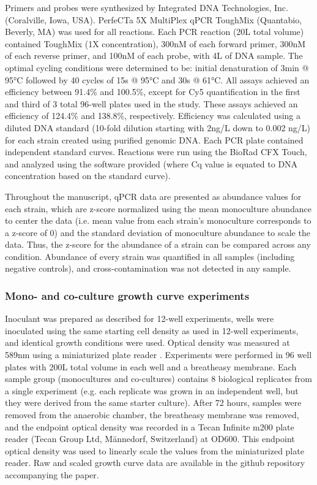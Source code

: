 \documentclass[11pt,onecolumn,notitlepage,openany,twoside]{book}
\begin{document}
\begin{refsection}
Primers and probes were synthesized by Integrated DNA Technologies, Inc. (Coralville, Iowa, USA). PerfeCTa 5X MultiPlex qPCR ToughMix (Quantabio, Beverly, MA) was used for all reactions. Each PCR reaction (20{\textmu}L total volume) contained ToughMix (1X concentration), 300nM of each forward primer, 300nM of each reverse primer, and 100nM of each probe, with 4{\textmu}L of DNA sample. The optimal cycling conditions were determined to be: initial denaturation of 3min @ 95°C followed by 40 cycles of 15s @  95°C and 30s @  61°C. All assays achieved an efficiency between 91.4\% and 100.5\%, except for Cy5 quantification in the first and third of 3 total 96-well plates used in the study. These assays achieved an efficiency of 124.4\% and 138.8\%, respectively. Efficiency was calculated using a diluted DNA standard (10-fold dilution starting with 2ng/{\textmu}L down to 0.002 ng/{\textmu}L) for each strain created using purified genomic DNA. Each PCR plate contained independent standard curves. Reactions were run using the BioRad CFX Touch, and analyzed using the software provided (where Cq value is equated to DNA concentration based on the standard curve).

Throughout the manuscript, qPCR data are presented as abundance values for each strain, which are z-score normalized using the mean monoculture abundance to center the data (i.e. mean value from each strain’s monoculture corresponds to a z-score of 0) and the standard deviation of monoculture abundance to scale the data. Thus, the z-score for the abundance of a strain can be compared across any condition. Abundance of every strain was quantified in all samples (including negative controls), and cross-contamination was not detected in any sample.

\subsubsection{Mono- and co-culture growth curve experiments}

Inoculant was prepared as described for 12-well experiments, wells were inoculated using the same starting cell density as used in 12-well experiments, and identical growth conditions were used. Optical density was measured at 589nm using a miniaturized plate reader \cite{Jensen2015-mw}. Experiments were performed in 96 well plates with 200{\textmu}L total volume in each well and a breatheasy membrane. Each sample group (monocultures and co-cultures) contains 8 biological replicates from a single experiment (e.g. each replicate was grown in an independent well, but they were derived from the same starter culture). After 72 hours, samples were removed from the anaerobic chamber, the breatheasy membrane was removed, and the endpoint optical density was recorded in a Tecan Infinite m200 plate reader (Tecan Group Ltd, Männedorf, Switzerland) at OD600. This endpoint optical density was used to linearly scale the values from the miniaturized plate reader. Raw and scaled growth curve data are available in the github repository accompanying the paper.


\end{refsection}
\end{document}

